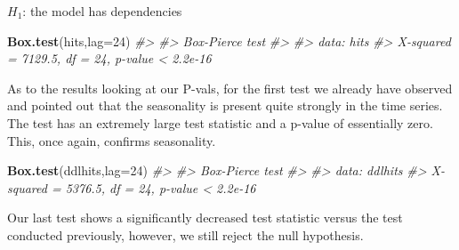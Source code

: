 \documentclass[]{article}
\newenvironment{Shaded}{\begin{snugshade}}{\end{snugshade}}
\newcommand{\CommentTok}[1]{\textcolor[rgb]{0.56,0.35,0.01}{\textit{#1}}}
\newcommand{\DataTypeTok}[1]{\textcolor[rgb]{0.13,0.29,0.53}{#1}}
\newcommand{\DecValTok}[1]{\textcolor[rgb]{0.00,0.00,0.81}{#1}}
\newcommand{\KeywordTok}[1]{\textcolor[rgb]{0.13,0.29,0.53}{\textbf{#1}}}
\newcommand{\NormalTok}[1]{#1}
\begin{document}
\(H_1\): the model has dependencies

\begin{Shaded}
\begin{Highlighting}[]
\KeywordTok{Box.test}\NormalTok{(hits,}\DataTypeTok{lag=}\DecValTok{24}\NormalTok{)}
\CommentTok{#> }
\CommentTok{#>  Box-Pierce test}
\CommentTok{#> }
\CommentTok{#> data:  hits}
\CommentTok{#> X-squared = 7129.5, df = 24, p-value < 2.2e-16}
\end{Highlighting}
\end{Shaded}

As to the results looking at our P-vals, for the first test we already
have observed and pointed out that the seasonality is present quite
strongly in the time series. The test has an extremely large test
statistic and a p-value of essentially zero. This, once again, confirms
seasonality.

\begin{Shaded}
\begin{Highlighting}[]
\KeywordTok{Box.test}\NormalTok{(ddlhits,}\DataTypeTok{lag=}\DecValTok{24}\NormalTok{)}
\CommentTok{#> }
\CommentTok{#>  Box-Pierce test}
\CommentTok{#> }
\CommentTok{#> data:  ddlhits}
\CommentTok{#> X-squared = 5376.5, df = 24, p-value < 2.2e-16}
\end{Highlighting}
\end{Shaded}

Our last test shows a significantly decreased test statistic versus the
test conducted previously, however, we still reject the null hypothesis.
\end{document}
